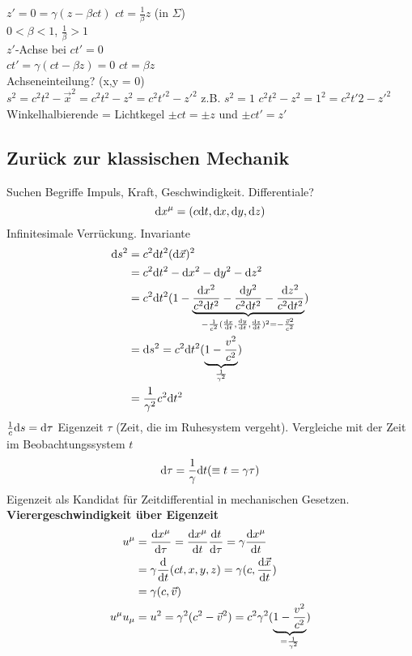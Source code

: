 $z' = 0 = \gamma (z - \beta c t)$ \conseq $ct = \frac{1}{\beta} z$ (in $\Sigma$)\\
$0 < \beta < 1$, \conseq $\frac{1}{\beta} > 1$\\

$z'$-Achse bei $ct' = 0$\\

$c t' = \gamma (ct - \beta z) = 0$ \conseq $ct = \beta z$\\

Achseneinteilung? (x,y = 0)\\
$s^2 = c^2 t^2 - \vec{x}^2 = c^2 t^2 - z^2 = c^2 {t'}^2 - z'^2$ 
z.B. $s^2 = 1$
$c^2 t^2 - z^2 = 1^2 = c^2 t'2 - z'^2$\\
Winkelhalbierende = Lichtkegel $\pm ct = \pm z$ und $\pm c t' = z'$


\subsection{Zurück zur klassischen Mechanik}
Suchen Begriffe Impuls, Kraft, Geschwindigkeit. Differentiale?
$$\mathrm d x^\mu = (c \mathrm d t, \mathrm d x, \mathrm d y, \mathrm d z)$$
Infinitesimale Verrückung.
\conseq Invariante
\begin{align*}
 \mathrm d s^2  &= c^2 \mathrm d t^2 (\mathrm d \vec{x})^2\\
 & = c^2 \mathrm d t^2 - \mathrm d x^2 - \mathrm d y^2 - \mathrm d z^2\\
 & = c^2 \mathrm d t^2 (1 - \underbrace{\frac{\mathrm d x^2}{c^2 \mathrm d t^2} - \frac{\mathrm d y^2}{c^2 \mathrm d t^2} - \frac{\mathrm d z^2}{c^2 \mathrm d t^2}}_{- \frac{1}{c^2} (\frac{\mathrm d x}{\mathrm d t}, \frac{\mathrm d y}{\mathrm d t}, \frac{\mathrm d z}{\mathrm d t})^2 = - \frac{\vec{v}^2}{c^2}})\\
 & = \mathrm d s^2 = c^2 \mathrm d t^2 (\underbrace{1 - \frac{v^2}{c^2}}_{\frac{1}{\gamma^2}})\\
 & = \frac{1}{\gamma^2} c^2 \mathrm d t^2
\end{align*}
$\frac{1}{c} \mathrm d s = \mathrm d \tau$ \conseq Eigenzeit $\tau$ (Zeit, die im Ruhesystem vergeht).
Vergleiche mit der Zeit im Beobachtungssystem $t$
$$\mathrm d \tau = \frac{1}{\gamma} \mathrm d t (\equiv t = \gamma \tau)$$
Eigenzeit als Kandidat für Zeitdifferential in mechanischen Gesetzen.
\conseq \textbf{Vierergeschwindigkeit über Eigenzeit}
\begin{align*}
	u^\mu &= \frac{\mathrm d x^\mu}{\mathrm d \tau} = \frac{\mathrm d x^\mu}{\mathrm d t} \frac{\mathrm d t}{\mathrm d \tau} = \gamma \frac{\mathrm d x^\mu}{\mathrm d t}\\
	&= \gamma \frac{\mathrm d}{\mathrm d t} (c t, x, y, z) = \gamma (c, \frac{\mathrm d \vec{x}}{\mathrm d t})\\
	&= \gamma (c, \vec{v})\\
	u^\mu u_\mu &= u^2 = \gamma^2 (c^2 - \vec{v}^2) = c^2 \gamma^2 (\underbrace{1 - \frac{v^2}{c^2}}_{= \frac{1}{\gamma^2}})
\end{align*}
